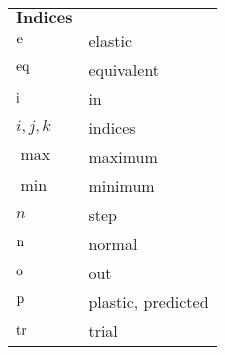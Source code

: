 \begin{table}[htb]
  \centering
    \begin{tabular}{p{3cm}p{10.5cm}}
    $\textbf{Indices}$ & \\
    ${\rm{e}}$  & elastic \\
    ${\rm{eq}}$  & equivalent \\
    ${\rm{i}}$  & in \\
    $i,j,k$  & indices \\
    $\max$  & maximum \\
    $\min$  & minimum \\
    $n$  & step \\
    ${\rm{n}}$  & normal \\
    ${\rm{o}}$  & out \\
    ${\rm{p}}$  & plastic, predicted \\
    ${\rm{tr}}$  & trial \\
    \end{tabular}%
  \label{Tab:indices}%
\end{table}%

